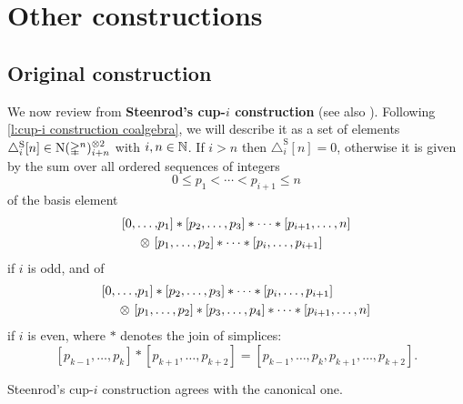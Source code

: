 
\section{Other constructions} \label{s:others}

\subsection{Original construction} \label{ss:original}

We now review from \cite[p.293]{steenrod1947products} \textbf{Steenrod's \mbox{cup-$i$} construction} (see also \cite[p.682]{mcclure2003multivariable}).
Following \cref{l:cup-i construction coalgebra}, we will describe it as a set of elements $\triangle_i^{\mathrm{S}} [n] \in \operatorname{N}(\mathbb{\Delta}^n)^{\otimes 2}_{i+n}$ with $i,n \in \mathbb{N}$.
If $i > n$ then $\triangle_i^{\mathrm{S}} [n] = 0$, otherwise it is given by the sum over all ordered sequences of integers
\[
0 \leq p_1 < \cdots < p_{i+1} \leq n
\]
of the basis element
\begin{equation} \label{e:steenrod original i odd}
\begin{split}
[ 0, \dots, &{p_1} ] \ast [ {p_2}, \dots, {p_3} ] \ast \cdots \ast [ {p_{i+1}}, \dots, n ] \\
\otimes \ [ &{p_1}, \dots, {p_2} ] \ast \cdots \ast [ {p_{i}}, \dots, {p_{i+1}} ]
\end{split}
\end{equation}
if $i$ is odd, and of
\begin{equation} \label{e:steenrod original i even}
\begin{split}
[ 0, \dots, &{p_1} ] \ast [ {p_2}, \dots, {p_3} ] \ast \cdots \ast [ {p_{i}}, \dots, {p_{i+1}} ] \\
\otimes \ [ &{p_1}, \dots, {p_2} ] \ast [ {p_3}, \dots, {p_4} ] \ast \cdots \ast [ {p_{i+1}}, \dots, n ]
\end{split}
\end{equation}
if $i$ is even, where $\ast$ denotes the join of simplices:
\[
[{p_{k-1}}, \dots, {p_{k}} ] \ast [ {p_{k+1}}, \dots, p_{k+2}] = [{p_{k-1}}, \dots, p_k, p_{k+1}, \dots, p_{k+2}].
\]

\begin{theorem} \label{t:steenrod cup-i}
	Steenrod's \mbox{cup-$i$} construction agrees with the canonical one.
\end{theorem}

